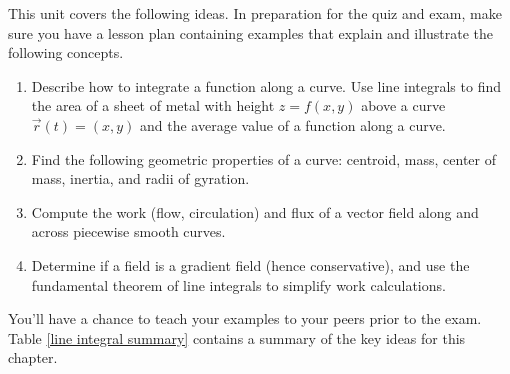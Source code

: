 \newcommand{\sagephysicalpropertiesthreed}{http://bmw.byuimath.com/dokuwiki/doku.php?id=physical_properties_in_3d}




\noindent 
This unit covers the following ideas. In preparation for the quiz and exam, make sure you have a lesson plan containing examples that explain and illustrate the following concepts.  
\begin{enumerate}
\item Describe how to integrate a function along a curve. Use line integrals to find the area of a sheet of metal with height $z=f(x,y)$ above a curve $\vec r(t)=\left(x,y\right)$ and the average value of a function along a curve.
\item Find the following geometric properties of a curve: centroid, mass, center of mass, inertia, and radii of gyration.
\item Compute the work (flow, circulation) and flux of a vector field along and across piecewise smooth curves.
\item Determine if a field is a gradient field (hence conservative), and use the fundamental theorem of line integrals to simplify work calculations.
\end{enumerate}
You'll have a chance to teach your examples to your peers prior to the exam. Table \ref{line integral summary} contains a summary of the key ideas for this chapter.


